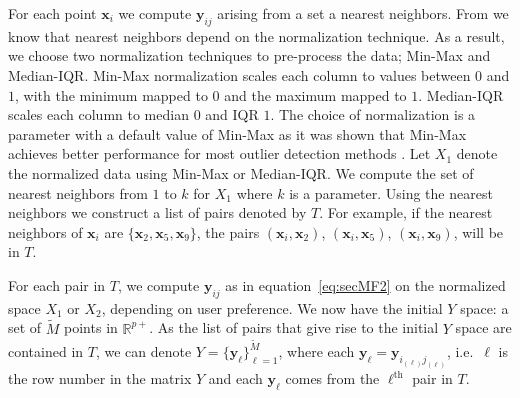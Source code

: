 \documentclass[letter,12pt]{article}
\begin{document}
For each point $\bm{x}_i$ we compute $\bm{y}_{ij}$ arising from a set a nearest neighbors. From \cite{kandanaarachchi2018normalization} we know that nearest neighbors depend on the normalization technique. As a result, we choose two normalization techniques to pre-process the data; Min-Max and Median-IQR. Min-Max normalization scales each column to values between $0$ and $1$, with the minimum mapped to $0$ and the maximum mapped to $1$. Median-IQR scales each column to median $0$ and IQR $1$. %
{\color{blue} The choice of normalization is a parameter with a default value of Min-Max as it was shown that Min-Max achieves better performance for most outlier detection methods \citep{kandanaarachchi2018normalization}. Let $X_1$ denote the normalized data using Min-Max or Median-IQR. We compute the set of nearest neighbors from $1$ to $k$ for $X_1$ where $k$ is a parameter.
}
Using the nearest neighbors we construct a list of pairs denoted by $T$. {\color{blue} For example, if the nearest neighbors of $\bm{x}_i$  are $\{\bm{x}_2, \bm{x}_5, \bm{x}_9 \}$,   the pairs $(\bm{x}_i, \bm{x}_2)$, $(\bm{x}_i, \bm{x}_5)$, $(\bm{x}_i, \bm{x}_9)$, will be in $T$. }

For each pair in $T$, we compute $\bm{y}_{ij}$ as in equation~\eqref{eq:secMF2} on the normalized space $X_1$ or $X_2$, depending on user preference. We now have the initial $Y$ space: a set of $\tilde{M}$ points in $\mathbb{R}^{p+}$. As the list of pairs that give rise to the initial $Y$ space are contained in $T$, we can denote $Y = \{ \bm{y}_\ell \}_{\ell=1}^{\tilde{M}}$, where each $\bm{y}_\ell = \bm{y}_{i_{(\ell)} j_{(\ell)} }$, i.e.\ $\ell$ is the row number in the matrix $Y$ and each $\bm{y}_\ell$ comes from the $\ell^{\text{th}}$ pair in $T$.
\end{document}
